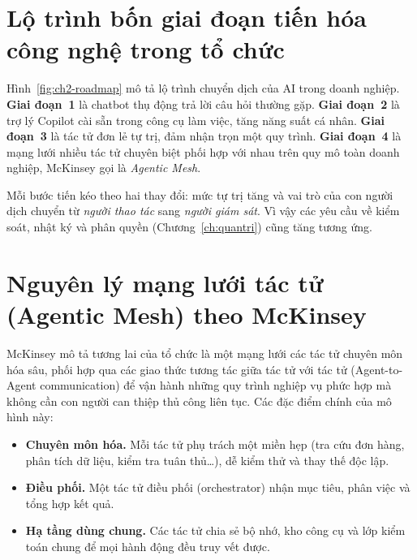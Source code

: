 \section{Lộ trình bốn giai đoạn tiến hóa công nghệ trong tổ chức}
Hình~\ref{fig:ch2-roadmap} mô tả lộ trình chuyển dịch của AI trong doanh nghiệp. \textbf{Giai đoạn~1} là chatbot thụ
động trả lời câu hỏi thường gặp. \textbf{Giai đoạn~2} là trợ lý Copilot cài sẵn trong công cụ làm việc, tăng năng suất
cá nhân. \textbf{Giai đoạn~3} là tác tử đơn lẻ tự trị, đảm nhận trọn một quy trình. \textbf{Giai đoạn~4} là mạng lưới
nhiều tác tử chuyên biệt phối hợp với nhau trên quy mô toàn doanh nghiệp, McKinsey gọi là \emph{Agentic Mesh}.


Mỗi bước tiến kéo theo hai thay đổi: mức tự trị tăng và vai trò của con người dịch chuyển từ \emph{người thao tác} sang
\emph{người giám sát}. Vì vậy các yêu cầu về kiểm soát, nhật ký và phân quyền (Chương~\ref{ch:quantri}) cũng tăng
tương ứng.

\section{Nguyên lý mạng lưới tác tử (Agentic Mesh) theo McKinsey}
McKinsey \cite{mckinsey_agents} mô tả tương lai của tổ chức là một mạng lưới các tác tử chuyên môn hóa sâu, phối hợp qua
các giao thức tương tác giữa tác tử với tác tử (Agent-to-Agent communication) để vận hành những quy trình nghiệp vụ phức
hợp mà không cần con người can thiệp thủ công liên tục. Các đặc điểm chính của mô hình này:
\begin{itemize}
  \item \textbf{Chuyên môn hóa.} Mỗi tác tử phụ trách một miền hẹp (tra cứu đơn hàng, phân tích dữ liệu, kiểm tra tuân
        thủ\dots), dễ kiểm thử và thay thế độc lập.
  \item \textbf{Điều phối.} Một tác tử điều phối (orchestrator) nhận mục tiêu, phân việc và tổng hợp kết quả.
  \item \textbf{Hạ tầng dùng chung.} Các tác tử chia sẻ bộ nhớ, kho công cụ và lớp kiểm toán chung để mọi hành động đều
        truy vết được.
\end{itemize}

